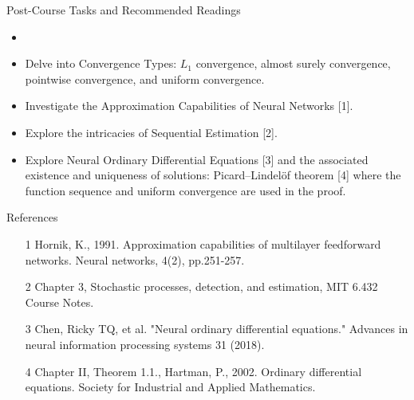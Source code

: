 \documentclass[10pt,xcolor=table,dvipsnames]{beamer}
\begin{document}
\begin{frame}{Post-Course Tasks and Recommended Readings}
    \begin{itemize}
        \item {}
        \item Delve into Convergence Types: \( L_1 \) convergence, almost surely convergence, pointwise convergence, and uniform convergence.
        \item Investigate the Approximation Capabilities of Neural Networks [1].
        \item Explore the intricacies of Sequential Estimation [2].
        \item Explore Neural Ordinary Differential Equations [3] and the associated existence and uniqueness of solutions: Picard–Lindelöf theorem [4] where the function sequence and uniform convergence are used in the proof.
    \end{itemize}
\end{frame}


\begin{frame}{References}
    \begin{itemize}
        \item [1] Hornik, K., 1991. Approximation capabilities of multilayer feedforward networks. Neural networks, 4(2), pp.251-257.
        \item [2] Chapter 3, Stochastic processes, detection, and estimation, MIT 6.432 Course Notes.
      \item [3] Chen, Ricky TQ, et al. "Neural ordinary differential equations." Advances in neural information processing systems 31 (2018).
        \item [4] Chapter II, Theorem 1.1., Hartman, P., 2002. Ordinary differential equations. Society for Industrial and Applied Mathematics.
    \end{itemize}
\end{frame}
\end{document}
